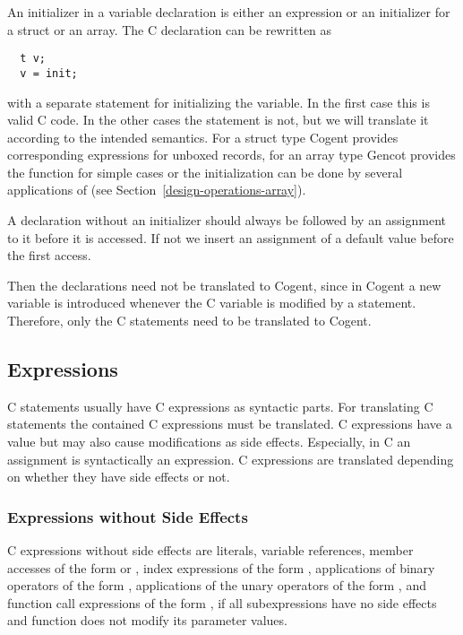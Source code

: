 An initializer  in a variable declaration  is either an expression or an initializer for
a struct or an array. The C declaration can be rewritten as
\begin{verbatim}
  t v;
  v = init;
\end{verbatim}
with a separate statement for initializing the variable. In the first case this is valid C code. In the other cases 
the statement is not, but we will translate it according to the intended semantics. For a struct type Cogent provides
corresponding expressions for unboxed records, for an array type Gencot provides the function  for
simple cases or the initialization can be done by several applications of  (see Section~\ref{design-operations-array}).

A declaration without an initializer should always be followed by an assignment to it before it is accessed. If not
we insert an assignment of a default value before the first access.

Then the declarations need not be translated to Cogent, since in Cogent a new variable is introduced whenever
the C variable is modified by a statement. Therefore, only the C statements need to be translated to Cogent.

\subsection{Expressions}
\label{app-transfunction-expr}

C statements usually have C expressions as syntactic parts. For translating C statements the contained C expressions must be 
translated. C expressions have a value but may also cause modifications as side effects. Especially, in C an assignment
is syntactically an expression. C expressions are translated depending on whether they have side effects or not.

\subsubsection{Expressions without Side Effects}

C expressions without side effects are literals, variable references, member accesses of the form  or 
, index
expressions of the form , applications of binary operators of the form , 
applications of the unary operators \code{+,-,!,~} of the form , and function 
call expressions of the form , if all subexpressions
 have no side effects and function  does not modify its parameter values. 

